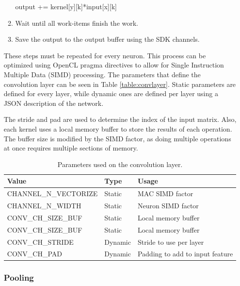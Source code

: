\begin{enumerate}
\begin{enumerate}
    output += kernel[y][k]*input[x][k]
    \item Wait until all work-items finish the work.
    \item Save the output to the output buffer using the SDK channels.
\end{enumerate}

These steps must be repeated for every neuron. This process can be optimized using OpenCL
pragma directives to allow for Single Instruction Multiple Data (SIMD) processing. The
parameters that define the convolution layer can be seen in Table \ref{table:convlayer}.
Static parameters are defined for every layer, while dynamic ones are defined per layer
using a JSON description of the network.

The stride and pad are used to determine the index of the input matrix.
Also, each kernel uses a local memory buffer to store the results of each operation.
The buffer size is modified by the SIMD factor, as doing multiple operations at
once requires multiple sections of memory.

\begin{table}[H]
    \begin{center}
        \caption{Parameters used on the convolution layer.}
        \begin{tabular}{lll}
        \hline
        Value                 & Type    & Usage                           \\ \hline
        CHANNEL\_N\_VECTORIZE & Static  & MAC SIMD factor                 \\
        CHANNEL\_N\_WIDTH     & Static  & Neuron SIMD factor              \\
        CONV\_CH\_SIZE\_BUF   & Static  & Local memory buffer             \\
        CONV\_CH\_SIZE\_BUF   & Static  & Local memory buffer             \\
        CONV\_CH\_STRIDE      & Dynamic & Stride to use per layer         \\
        CONV\_CH\_PAD         & Dynamic & Padding to add to input feature \\ \hline
        \end{tabular}
        \label{tab:convlayer}
    \end{center}
\end{table}

\subsubsection{Pooling}


\end{enumerate}
